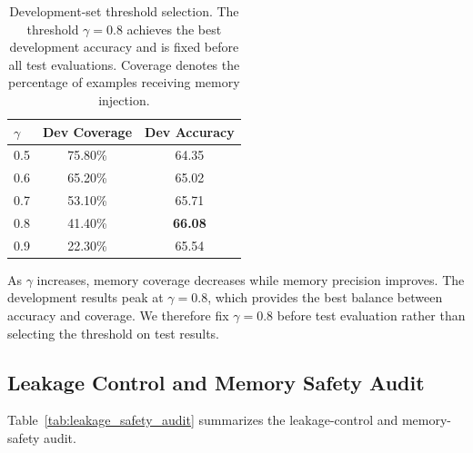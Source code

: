 \documentclass[11pt]{article}
\begin{document}
\begin{table}[!htbp]
\centering
\scriptsize
\setlength{\tabcolsep}{5pt}
\renewcommand{\arraystretch}{0.95}
\begin{tabular}{l c c}
\hline
$\gamma$ & Dev Coverage & Dev Accuracy \\
\hline
0.5 & 75.80\% & 64.35 \\
0.6 & 65.20\% & 65.02 \\
0.7 & 53.10\% & 65.71 \\
0.8 & 41.40\% & \textbf{66.08} \\
0.9 & 22.30\% & 65.54 \\
\hline
\end{tabular}
\caption{Development-set threshold selection. The threshold $\gamma=0.8$ achieves the best development accuracy and is fixed before all test evaluations. Coverage denotes the percentage of examples receiving memory injection.}
\label{tab:dev_threshold_selection}
\end{table}

As $\gamma$ increases, memory coverage decreases while memory precision improves. The development results peak at $\gamma=0.8$, which provides the best balance between accuracy and coverage. We therefore fix $\gamma=0.8$ before test evaluation rather than selecting the threshold on test results.

\subsection{Leakage Control and Memory Safety Audit}
Table~\ref{tab:leakage_safety_audit} summarizes the leakage-control and memory-safety audit.

\begin{table}[!t]
\centering
\scriptsize
\setlength{\tabcolsep}{4pt}
\renewcommand{\arraystretch}{0.95}
\caption{Leakage-control and memory-safety audit.}
\label{tab:leakage_safety_audit}
\end{table}
\end{document}
